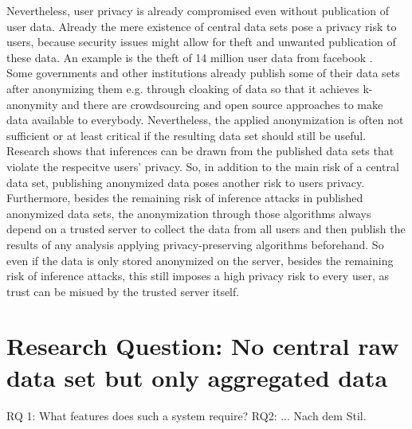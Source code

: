 Nevertheless, user privacy is already compromised even without publication of user data.
Already the mere existence of central data sets pose a privacy risk to users, because security issues might allow for theft and unwanted publication of these data.
An example is the theft of 14 million user data from facebook \parencite{facebook}.\\

Some governments and other institutions already publish some of their data sets after anonymizing them e.g. through cloaking of data so that it achieves k-anonymity and there are crowdsourcing and open source approaches to make data available to everybody. 
Nevertheless, the applied anonymization is often not sufficient or at least critical if the resulting data set should still be useful. Research shows that inferences can be drawn from the published data sets that violate the respecitve users' privacy. So, in addition to the main risk of a central data set, publishing anonymized data poses another risk to users privacy.\\

Furthermore, besides the remaining risk of inference attacks in published anonymized data sets, the anonymization through those algorithms always depend on a trusted server to collect the data from all users and then publish the results of any analysis applying privacy-preserving algorithms beforehand. So even if the data is only stored anonymized on the server, besides the remaining risk of inference attacks, this still imposes a high privacy risk to every user, as trust can be misued by the trusted server itself.\\

\section{Research Question: No central raw data set but only aggregated data}
RQ 1: What features does such a system require?
RQ2: ...
Nach dem Stil.


